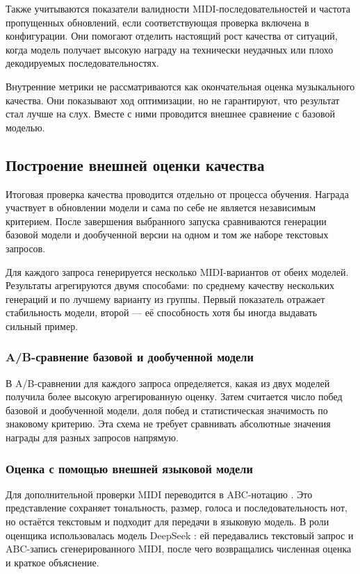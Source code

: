\documentclass[a4paper,12pt]{extarticle}
\begin{document}
Также учитываются показатели валидности MIDI-последовательностей и частота
пропущенных обновлений, если соответствующая проверка включена в конфигурации.
Они помогают отделить настоящий рост качества от ситуаций, когда модель
получает высокую награду на технически неудачных или плохо декодируемых
последовательностях.

Внутренние метрики не рассматриваются как окончательная оценка музыкального
качества. Они показывают ход оптимизации, но не гарантируют, что результат
стал лучше на слух. Вместе с ними проводится внешнее сравнение
с базовой моделью.

\subsection{Построение внешней оценки качества}

Итоговая проверка качества проводится отдельно от процесса обучения. Награда
участвует в обновлении модели и сама по себе не является независимым
критерием. После завершения выбранного запуска сравниваются генерации базовой
модели и дообученной версии на одном и том же наборе текстовых запросов.

Для каждого запроса генерируется несколько MIDI-вариантов от обеих моделей.
Результаты агрегируются двумя способами: по среднему качеству нескольких
генераций и по лучшему варианту из группы. Первый показатель отражает
стабильность модели, второй --- её способность хотя бы иногда выдавать сильный
пример.

\subsubsection{A/B-сравнение базовой и дообученной модели}

В A/B-сравнении для каждого запроса определяется, какая из двух моделей
получила более высокую агрегированную оценку. Затем считается число побед
базовой и дообученной модели, доля побед и статистическая значимость по
знаковому критерию. Эта схема не требует сравнивать
абсолютные значения награды для разных запросов напрямую.

\subsubsection{Оценка с помощью внешней языковой модели}

Для дополнительной проверки MIDI переводится в ABC-нотацию \cite{abcnotation2026}. Это
представление сохраняет тональность, размер, голоса и последовательность нот,
но остаётся текстовым и подходит для передачи в языковую модель. В роли
оценщика использовалась модель DeepSeek \cite{deepseekv3report2024}: ей передавались текстовый запрос и
ABC-запись сгенерированного MIDI, после чего возвращались численная оценка и
краткое объяснение.
\end{document}
